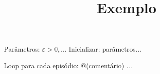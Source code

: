 \documentclass[brazilian,preview]{standalone}
\title{Exemplo}
\begin{document}
\begin{algorithm}
Parâmetros: $\varepsilon > 0, \dots$
Inicializar:
    parâmetros...

Loop para cada episódio: @\hfill@ (comentário)
    ...
\end{algorithm}
\end{document}
